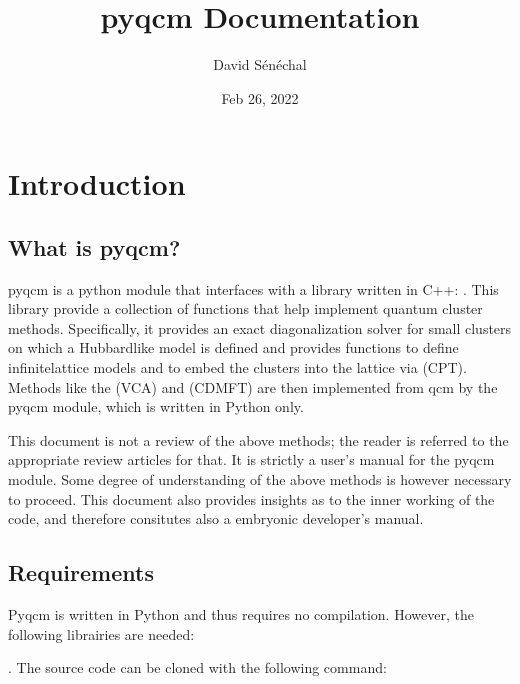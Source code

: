 \documentclass[letterpaper,10pt,english]{sphinxmanual}
\title{pyqcm Documentation}
\date{Feb 26, 2022}
\author{David Sénéchal}
\begin{document}
\pagestyle{empty}
\sphinxmaketitle
\pagestyle{plain}
\sphinxtableofcontents
\pagestyle{normal}
\label{\detokenize{index::doc}}



\chapter{Introduction}
\label{\detokenize{intro:introduction}}\label{\detokenize{intro::doc}}

\section{What is pyqcm?}
\label{\detokenize{intro:what-is-pyqcm}}
\sphinxAtStartPar
pyqcm is a python module that interfaces with a library written in C++: .
This library provide a collection of functions that help implement quantum cluster methods.
Specifically, it provides an exact diagonalization solver for small clusters on which a Hubbard\sphinxhyphen{}like model is defined and provides functions to define infinite\sphinxhyphen{}lattice models and to embed the clusters into the lattice via  (CPT). Methods like the  (VCA) and  (CDMFT) are then implemented from qcm by the pyqcm module, which is written in Python only.

\sphinxAtStartPar
This document is not a review of the above methods; the reader is referred to the appropriate review articles for that. It is strictly a user’s manual for the pyqcm module.
Some degree of understanding of the above methods is however necessary to proceed.
This document also provides insights as to the inner working of the code, and therefore consitutes also a embryonic developer’s manual.


\section{Requirements}
\label{\detokenize{intro:requirements}}
\sphinxAtStartPar
Pyqcm is written in Python and thus requires no compilation.
However, the following librairies are needed:

\sphinxAtStartPar
{}. The source code can be cloned with the following command:

\begin{sphinxVerbatim}[commandchars=\\\{\}]
  
\end{sphinxVerbatim}
\end{document}
